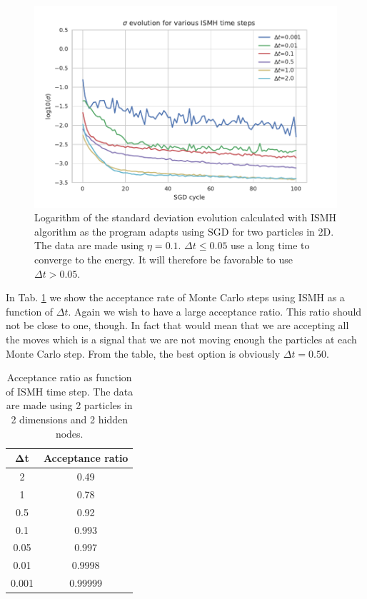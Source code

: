 \begin{figure}[H]
\centering
\includegraphics[scale=1.0]{plot5.pdf}
\caption{Logarithm of the standard deviation evolution calculated with ISMH algorithm as the program adapts using SGD for two particles in 2D. The data are made using $\eta = 0.1$. $\Delta t\leq 0.05$ use a long time to converge to the energy. It will therefore be favorable to use $\Delta t > 0.05$.}
\label{Fig:5}
\end{figure}
In Tab. \ref{Tab:2} we show the acceptance rate of Monte Carlo steps using ISMH as a function of $\Delta t$. Again we wish to have a large acceptance ratio. This ratio should not be close to one, though.  In fact that would mean that we are accepting all the moves which is a signal that we are not moving enough the particles at each Monte Carlo step. From the table, the best option is obviously $\Delta t = 0.50$. 

\begin{table}[H]
\centering
\caption{Acceptance ratio as function of ISMH time step. The data are made using 2 particles in 2 dimensions and 2 hidden nodes.}
\begin{tabular}{c| c } 
\textbf{$\boldsymbol{\Delta}$t} & \textbf{Acceptance ratio} \\ \hline
2 & 0.49 \\
1 & 0.78 \\
0.5 & 0.92  \\
0.1  &  0.993 \\
0.05  &  0.997 \\
0.01  &  0.9998 \\
0.001 & 0.99999 \\ 
\end{tabular}
\label{Tab:2}
\end{table} 

